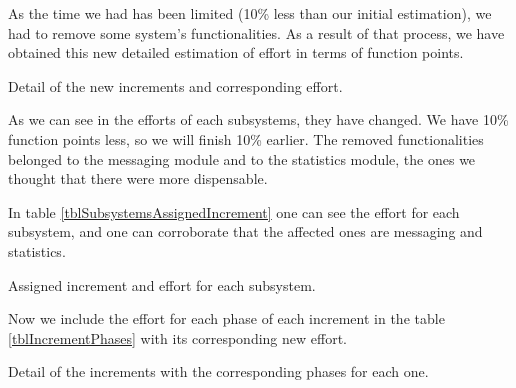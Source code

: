 As the time we had has been limited (10\% less than our initial estimation), we had to remove some system's functionalities. As a result of that process, we have obtained this new detailed estimation of effort in terms of function points.

\begin{table}[hbtp]
\centering

\caption{Detail of the new increments and corresponding effort.}
\label{tblIncrementsSubsystems}
\end{table}

As we can see in the efforts of each subsystems, they have changed. We have 10\% function points less, so we will finish 10\% earlier. The removed functionalities belonged to the messaging module and to the statistics module, the ones we thought that there were more dispensable. 

In table \ref{tblSubsystemsAssignedIncrement} one can see the effort for each subsystem, and one can corroborate that the affected ones are messaging and statistics.

\begin{table}[hbtp]
\centering

\caption{Assigned increment and effort for each subsystem.}
\label{tblSubsystemsAssignedIncrement}
\end{table}

Now we include the effort for each phase of each increment in the table \ref{tblIncrementPhases} with its corresponding new effort.

\begin{table}[hbtp]
\centering

\caption{Detail of the increments with the corresponding phases for each one.}
\label{tblIncrementPhases}
\end{table}